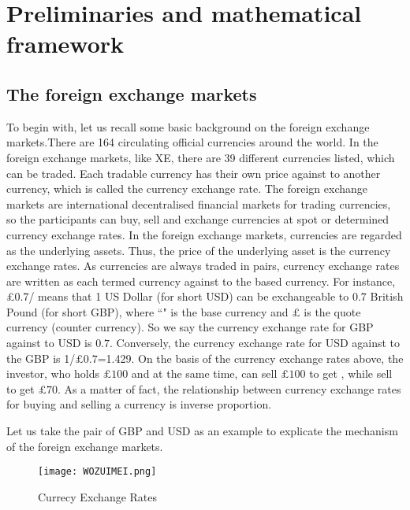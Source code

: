 \documentclass[11pt]{article}
\numberwithin{equation}{section}
\begin{document}
\section{Preliminaries and mathematical framework}

\subsection{The foreign exchange markets}

To begin with, let us recall some basic background on the foreign exchange markets.There are 164 circulating official currencies around the world. In the foreign 
exchange markets, like XE, there are 39 different currencies listed, which can be traded. Each tradable currency has their own price against to another 
currency, which is called the currency exchange rate. The foreign exchange markets are international decentralised financial markets for trading currencies, so the 
participants can buy, sell and exchange currencies at spot or determined currency exchange rates. In the foreign exchange markets, currencies are regarded as the 
underlying assets. Thus, the price of the underlying asset is the currency exchange rates. As currencies are always traded in pairs, currency exchange rates are 
written as  each termed currency against to the based currency.  For instance, \pounds 0.7/ means that 1 US Dollar (for short USD) can be exchangeable 
to 0.7 British Pound (for short GBP), where ``\textdollar" is the base currency and $\pounds $ is the quote currency (counter currency). So we say the currency exchange 
rate for GBP against to USD is $ 0.7$. Conversely, the currency exchange rate for USD against to the GBP is 1\textdollar/$\pounds 0.7$=1.429. On the basis of the 
currency exchange rates above, the investor, who holds $\pounds 100$ and   at the same  time, can sell $\pounds 100$  to get , while  
sell   to get $\pounds 70$. As a matter of fact, the relationship between currency exchange rates for buying and selling a currency is inverse proportion. 

Let us take the pair of GBP and USD as an example to explicate  the  mechanism of the foreign exchange markets.
\begin{figure}[htb]
	\begin{minipage}[b]{1.0\linewidth}
		\centering
		\centerline{\texttt{[image: WOZUIMEI.png]}}
	\end{minipage}
	\caption{Currecy Exchange Rates}
	\label{WOZUIMEI}
\end{figure}
\end{document}
